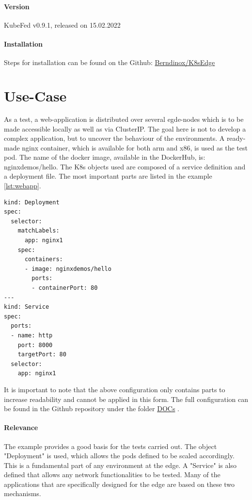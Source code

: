 \documentclass[MIC,Master,english]{twbook}%
\begin{document}
\paragraph{Version} KubeFed v0.9.1, released on 15.02.2022

\paragraph{Installation} Steps for installation can be found on the Github: \hyperref{https://github.com/Berndinox/K8sEdge/blob/main/DOCs/kubefed-install.md}{}{}{Berndinox/K8sEdge} \cite{bk-gh-kf-install}

\section{Use-Case}
\label{sec:dsrusecase}
\label{sec:dsrusecaseweb}
As a test, a web-application is distributed over several egde-nodes which is to be made accessible locally as well as via ClusterIP. The goal here is not to develop a complex application, but to uncover the behaviour of the environments. A ready-made nginx container, which is available for both arm and x86, is used as the test pod. The name of the docker image, available in the DockerHub, is: nginxdemos/hello. The \ac{K8s} objects used are composed of a service definition and a deployment file. The most important parts are listed in the example \autoref{lst:webapp}.

\vspace{\baselineskip}
\begin{minipage}{\linewidth}
    \begin{lstlisting}[caption={Web-application code},captionpos=b,label=lst:webapp]
kind: Deployment
spec:
  selector:
    matchLabels:
      app: nginx1
    spec:
      containers:
      - image: nginxdemos/hello
        ports:
        - containerPort: 80
---
kind: Service
spec:
  ports:
  - name: http
    port: 8000
    targetPort: 80
  selector:
    app: nginx1
    \end{lstlisting}
\end{minipage}


It is important to note that the above configuration only contains parts to increase readability and cannot be applied in this form. The full configuration can be found in the Github repository under the folder \hyperref{https://github.com/Berndinox/K8sEdge/blob/main/DOCs/}{}{}{DOCs} \cite{bk-gh-docs}.

\paragraph{Relevance} The example provides a good basis for the tests carried out. The object "Deployment" is used, which allows the pods defined to be scaled accordingly. This is a fundamental part of any environment at the edge. A "Service" is also defined that allows any network functionalities to be tested. Many of the applications that are specifically designed for the edge are based on these two mechanisms.
\end{document}
